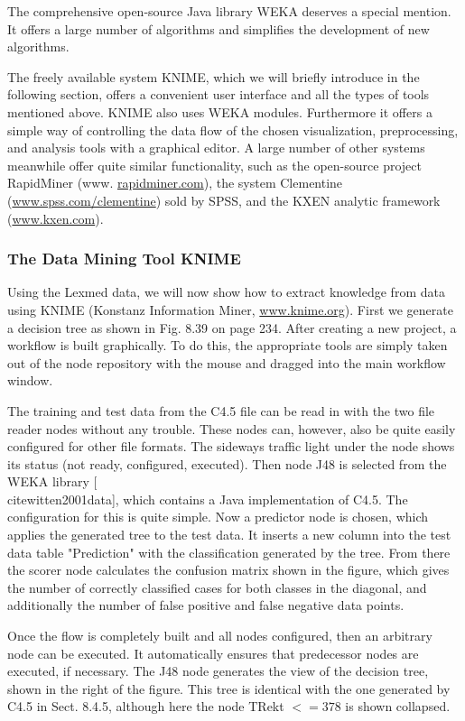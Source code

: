 \documentclass[10pt]{book}
\begin{document}
The comprehensive open-source Java library WEKA deserves a special mention. It offers a large number of algorithms and simplifies the development of new algorithms.

The freely available system KNIME, which we will briefly introduce in the following section, offers a convenient user interface and all the types of tools mentioned above. KNIME also uses WEKA modules. Furthermore it offers a simple way of controlling the data flow of the chosen visualization, preprocessing, and analysis tools with a graphical editor. A large number of other systems meanwhile offer quite similar functionality, such as the open-source project RapidMiner (www. \href{http://rapidminer.com}{rapidminer.com}), the system Clementine (\href{http://www.spss.com/clementine}{www.spss.com/clementine}) sold by SPSS, and the KXEN analytic framework (\href{http://www.kxen.com}{www.kxen.com}).

\subsubsection*{The Data Mining Tool KNIME}
Using the Lexmed data, we will now show how to extract knowledge from data using KNIME (Konstanz Information Miner, \href{http://www.knime.org}{www.knime.org}). First we generate a decision tree as shown in Fig. 8.39 on page 234. After creating a new project, a workflow is built graphically. To do this, the appropriate tools are simply taken out of the node repository with the mouse and dragged into the main workflow window.

The training and test data from the C4.5 file can be read in with the two file reader nodes without any trouble. These nodes can, however, also be quite easily configured for other file formats. The sideways traffic light under the node shows its status (not ready, configured, executed). Then node J48 is selected from the WEKA library [\\cite{witten2001data}], which contains a Java implementation of C4.5. The configuration for this is quite simple. Now a predictor node is chosen, which applies the generated tree to the test data. It inserts a new column into the test data table "Prediction" with the classification generated by the tree. From there the scorer node calculates the confusion matrix shown in the figure, which gives the number of correctly classified cases for both classes in the diagonal, and additionally the number of false positive and false negative data points.

Once the flow is completely built and all nodes configured, then an arbitrary node can be executed. It automatically ensures that predecessor nodes are executed, if necessary. The J48 node generates the view of the decision tree, shown in the right of the figure. This tree is identical with the one generated by C4.5 in Sect. 8.4.5, although here the node TRekt $<=378$ is shown collapsed.
\end{document}
